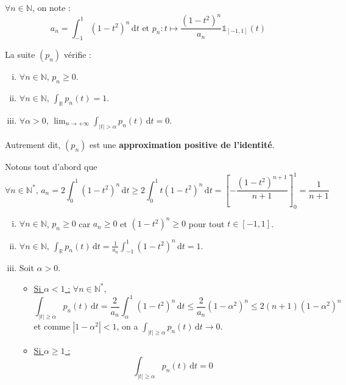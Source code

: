 



	
	
	\begin{notation}
		$\forall n \in \mathbb{N}$, on note :
		\[ a_n = \int_{-1}^1 (1-t^2)^n \, \mathrm{d}t \text{ et } p_n : t \mapsto \frac{(1-t^2)^n}{a_n} \mathbb{1}_{[-1, 1]}(t) \]
	\end{notation}

	\begin{lemma}
		\label{theoreme-weierstrass-convolution-1}
		La suite $(p_n)$ vérifie :
		\begin{enumerate}[(i)]
			\item $\forall n \in \mathbb{N}$, $p_n \geq 0$.
			\item $\forall n \in \mathbb{N}$, $\int_{\mathbb{R}} p_n(t) = 1$.
			\item $\forall \alpha > 0$, $\lim_{n \rightarrow +\infty} \int_{|t| > \alpha} p_n(t) \, \mathrm{d}t = 0$.
		\end{enumerate}
		Autrement dit, $(p_n)$ est une \textbf{approximation positive de l'identité}.
	\end{lemma}

	\begin{demonstration}
		Notons tout d'abord que
		\[ \forall n \in \mathbb{N}^*, \, a_n = 2 \int_0^1 (1-t^2)^n \, \mathrm{d}t \geq 2 \int_0^1 t (1-t^2)^n \, \mathrm{d}t = \left[ - \frac{(1-t^2)^{n+1}}{n+1} \right]_0^1 = \frac{1}{n+1}  \]
		\begin{enumerate}[(i)]
			\item $\forall n \in \mathbb{N}$, $p_n \geq 0$ car $a_n \geq 0$ et $(1-t^2)^n \geq 0$ pour tout $t \in [-1, 1]$.
			\item $\forall n \in \mathbb{N}$, $\int_{\mathbb{R}} p_n(t) \, \mathrm{d}t = \frac{1}{a_n} \int_{-1}^1 (1-t^2)^n \, \mathrm{d}t = 1$.
			\item Soit $\alpha > 0$.
			\begin{itemize}
				\item \underline{Si $\alpha < 1$ :} $\forall n \in \mathbb{N}^*$,
				\[ \int_{|t| \geq \alpha} p_n(t) \, \mathrm{d}t = \frac{2}{a_n} \int_\alpha^1 (1-t^2)^n \, \mathrm{d}t \leq \frac{2}{a_n} (1-\alpha^2)^n \leq 2(n+1)(1-\alpha^2)^n \]
				et comme $|1-\alpha^2| < 1$, on a $\int_{|t| \geq \alpha} p_n(t) \, \mathrm{d}t \longrightarrow 0$.
				\item \underline{Si $\alpha \geq 1$ :}
				\[ \int_{|t| \geq \alpha} p_n(t) \, \mathrm{d}t = 0 \]
			\end{itemize}
		\end{enumerate}
	\end{demonstration}
	
